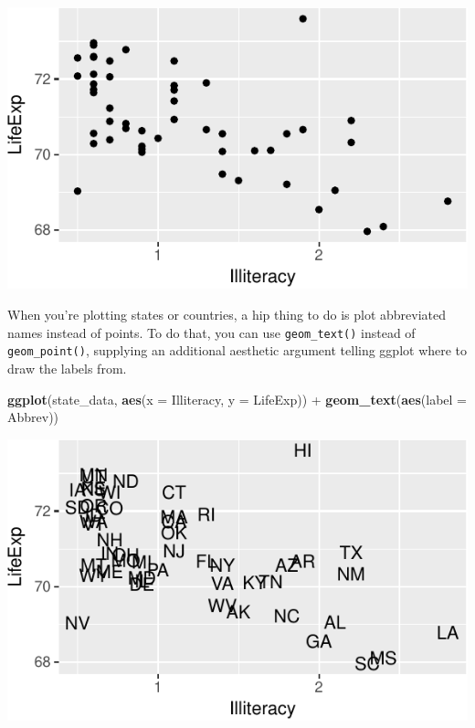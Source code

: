 \documentclass[12pt,oneside,openany]{tufte-book}
\newenvironment{Shaded}{}{}
\newcommand{\KeywordTok}[1]{\textcolor[rgb]{0.00,0.44,0.13}{\textbf{{#1}}}}
\newcommand{\DataTypeTok}[1]{\textcolor[rgb]{0.56,0.13,0.00}{{#1}}}
\newcommand{\StringTok}[1]{\textcolor[rgb]{0.25,0.44,0.63}{{#1}}}
\newcommand{\NormalTok}[1]{{#1}}
\begin{document}
\includegraphics{pdaps_files/figure-latex/scatter-1}

When you're plotting states or countries, a hip thing to do is plot
abbreviated names instead of points. To do that, you can use
\texttt{geom\_text()} instead of \texttt{geom\_point()}, supplying an
additional aesthetic argument telling ggplot where to draw the labels
from.

\begin{Shaded}
\begin{Highlighting}[]
\KeywordTok{ggplot}\NormalTok{(state_data, }\KeywordTok{aes}\NormalTok{(}\DataTypeTok{x =} \NormalTok{Illiteracy, }\DataTypeTok{y =} \NormalTok{LifeExp)) +}\StringTok{ }
\StringTok{    }\KeywordTok{geom_text}\NormalTok{(}\KeywordTok{aes}\NormalTok{(}\DataTypeTok{label =} \NormalTok{Abbrev))}
\end{Highlighting}
\end{Shaded}

\includegraphics{pdaps_files/figure-latex/scatter-text-1}
\end{document}
